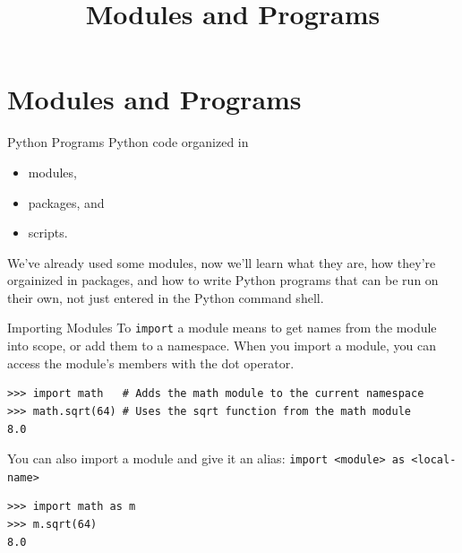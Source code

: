 \documentclass[smaller, aspectratio=1610]{beamer}
\date{}
\title{Modules and Programs}
\begin{document}
\maketitle

\section{Modules and Programs}
\label{sec:org07f77ec}

\begin{frame}[label={sec:org86a5918}]{Python Programs}
Python code organized in

\begin{itemize}
\item modules,
\item packages, and
\item scripts.
\end{itemize}

We've already used some modules, now we'll learn what they are, how they're orgainized in packages, and how to write Python programs that can be run on their own, not just entered in the Python command shell.
\end{frame}

\begin{frame}[label={sec:org40d2d7c},fragile]{Importing Modules}
 To \texttt{import} a module means to get names from the module into scope, or add them to a namespace. When you import a module, you can access the module's members with the dot operator.

\lstset{language=Python,label= ,caption= ,captionpos=b,numbers=none}
\begin{lstlisting}
>>> import math   # Adds the math module to the current namespace
>>> math.sqrt(64) # Uses the sqrt function from the math module
8.0
\end{lstlisting}

You can  also import a module and give it an alias: \texttt{import <module> as <local-name>}

\lstset{language=Python,label= ,caption= ,captionpos=b,numbers=none}
\begin{lstlisting}
>>> import math as m
>>> m.sqrt(64)
8.0
\end{lstlisting}
\end{frame}
\end{document}
